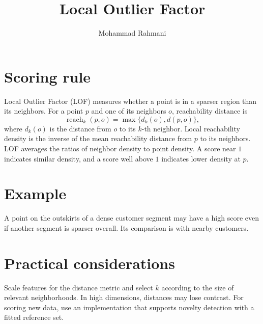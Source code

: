 \documentclass[a4paper]{article}
\title{Local Outlier Factor}
\date{}
\author{Mohammad Rahmani}
\begin{document}
   \maketitle

\section{Scoring rule}
Local Outlier Factor (LOF) measures whether a point is in a sparser region than its neighbors. For a point \(p\) and one of its neighbors \(o\), reachability distance is
\[
\operatorname{reach}_k(p,o)=\max\{d_k(o),d(p,o)\},
\]
where \(d_k(o)\) is the distance from \(o\) to its \(k\)-th neighbor. Local reachability density is the inverse of the mean reachability distance from \(p\) to its neighbors. LOF averages the ratios of neighbor density to point density. A score near \(1\) indicates similar density, and a score well above \(1\) indicates lower density at \(p\).

\section{Example}
A point on the outskirts of a dense customer segment may have a high score even if another segment is sparser overall. Its comparison is with nearby customers.

\section{Practical considerations}
Scale features for the distance metric and select \(k\) according to the size of relevant neighborhoods. In high dimensions, distances may lose contrast. For scoring new data, use an implementation that supports novelty detection with a fitted reference set.



   
   
\end{document}
